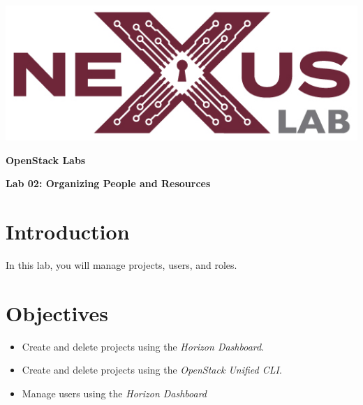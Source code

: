 \documentclass[letterpaper, 12pt]{article}
\begin{document}
\begin{titlepage}
    \centering
    \includegraphics[scale=0.5]{images/nexus_lab_logo.png}

    \vspace*{\baselineskip}

    \textbf{\Large OpenStack Labs}

    \vspace*{\baselineskip}

    \textbf{\Large Lab 02: Organizing People and Resources}
    \vspace*{\fill}
\end{titlepage}

{
    \fancyhf{}
    \fancyfoot[R]{\footnotesize\thepage}
    \renewcommand{\headrulewidth}{0pt}
}

\pagestyle{fancy}
\tableofcontents
\clearpage

\section*{Introduction}
\label{sec:introduction}
In this lab, you will manage projects, users, and roles.

\section*{Objectives}
\label{sec:objectives}
\begin{itemize}[itemsep=0pt]
    \item Create and delete projects using the \textit{Horizon Dashboard}.
    \item Create and delete projects using the \textit{OpenStack Unified CLI}.
    \item Manage users using the \textit{Horizon Dashboard}
\end{itemize}
\clearpage
\end{document}
